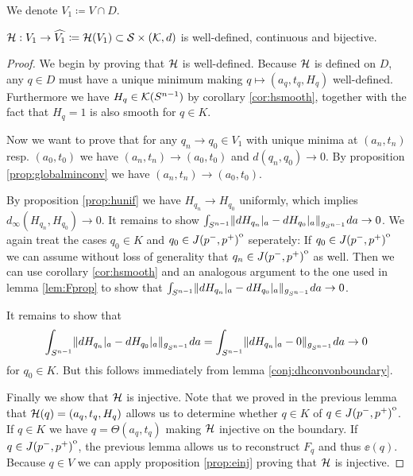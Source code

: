 We denote $V_1\coloneqq V\cap D$.
\begin{lemma}
    ${\mathcal{H}}:V_1\to \widehat{V_1}\coloneqq {\mathcal{H}}(V_1)\subset {\mathcal{S}}\times({\mathcal{K}}, d)$ is well-defined, continuous and bijective.
\end{lemma}
\begin{proof}
    We begin by proving that ${\mathcal{H}}$ is well-defined. Because ${\mathcal{H}}$ is defined on $D$, any $q\in D$ must have a unique minimum making $q\mapsto(a_q,t_q,H_q)$ well-defined. Furthermore we have $H_q\in {\mathcal{K}}({S^{n-1}})$ by corollary \ref{cor:hsmooth}, together with the fact that $H_q=1$ is also smooth for $q\in K$.

    Now we want to prove that for any $q_n\to q_0\in V_1$ with unique minima at $(a_n,t_n)$ resp. $(a_0,t_0)$ we have $(a_n,t_n) \to (a_0,t_0)$ and $d(q_n,q_0)\to 0$. By proposition \ref{prop:globalminconv} we have $(a_n,t_n) \to (a_0,t_0)$.
    
    By proposition \ref{prop:hunif} we have $H_{q_n}\to H_{q_0}$ uniformly, which implies $d_\infty(H_{q_n},H_{q_0})\to 0$. It remains to show $\int_{{S^{n-1}}} \lVert dH_{q_n}\rvert_a - dH_{q_0}\rvert_a \rVert_{g_{S^{n-1}}}da \to 0$. We again treat the cases $q_0\in K$ and $q_0\in {\kern0ptJ(p^-,p^+)}^{\mathrm{o}}$ seperately: If $q_0\in {\kern0ptJ(p^-,p^+)}^{\mathrm{o}}$ we can assume without loss of generality that $q_n\in {\kern0ptJ(p^-,p^+)}^{\mathrm{o}}$ as well. Then we can use corollary \ref{cor:hsmooth} and an analogous argument to the one used in lemma \ref{lem:Fprop} to show that $\int_{{S^{n-1}}} \lVert dH_{q_n}\rvert_a - dH_{q_0}\rvert_a \rVert_{g_{S^{n-1}}}da \to 0$.

    It remains to show that 
    \[
        \int_{{S^{n-1}}} \lVert dH_{q_n}\rvert_a - dH_{q_0}\rvert_a \rVert_{g_{S^{n-1}}}da = \int_{{S^{n-1}}} \lVert dH_{q_n}\rvert_a - 0\rVert_{g_{S^{n-1}}}da \to 0
    \] for $q_0\in K$. But this follows immediately from lemma \ref{conj:dhconvonboundary}.

    Finally we show that ${\mathcal{H}}$ is injective. Note that we proved in the previous lemma that ${\mathcal{H}}(q)=(a_q,t_q,H_q)$ allows us to determine whether $q\in K$ of $q\in {\kern0ptJ(p^-,p^+)}^{\mathrm{o}}$.
    If $q\in K$ we have $q = \Theta(a_q,t_q)$ making ${\mathcal{H}}$ injective on the boundary. If $q\in {\kern0ptJ(p^-,p^+)}^{\mathrm{o}}$, the previous lemma allows us to reconstruct $F_q$ and thus $\ee(q)$. Because $q\in V$ we can apply proposition \ref{prop:einj} proving that ${\mathcal{H}}$ is injective.
\end{proof}

